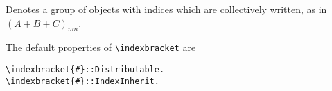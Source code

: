 
Denotes a group of objects with indices which are collectively
written, as in~$(A + B + C)_{m n}$.

The default properties of \verb|\indexbracket| are
\begin{verbatim}
\indexbracket{#}::Distributable.
\indexbracket{#}::IndexInherit.
\end{verbatim}
~



